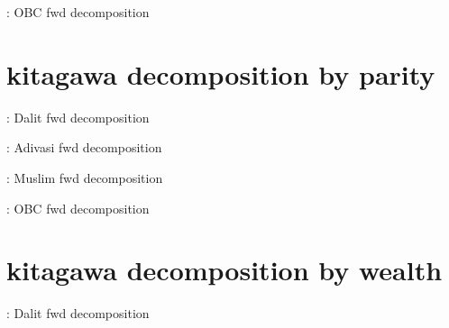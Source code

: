 \documentclass{article}
\begin{document}
\begin{table}[H]
    \centering
    \footnotesize %
    \caption{: OBC fwd decomposition}
    \label{tab:sumstat}
\end{table}





\section{kitagawa decomposition by parity}

\begin{table}[H]
    \centering
    \footnotesize %
    \caption{: Dalit fwd decomposition}
    \label{tab:sumstat}
\end{table}

\begin{table}[H]
    \centering
    \footnotesize %
    \caption{: Adivasi fwd decomposition}
    \label{tab:sumstat}
\end{table}



\begin{table}[H]
    \centering
    \footnotesize %
    \caption{: Muslim fwd decomposition}
    \label{tab:sumstat}
\end{table}

\begin{table}[H]
    \centering
    \footnotesize %
    \caption{: OBC fwd decomposition}
    \label{tab:sumstat}
\end{table}


\section{kitagawa decomposition by wealth}

\begin{table}[H]
    \centering
    \footnotesize %
    \caption{: Dalit fwd decomposition}
    \label{tab:sumstat}
\end{table}
\end{document}
